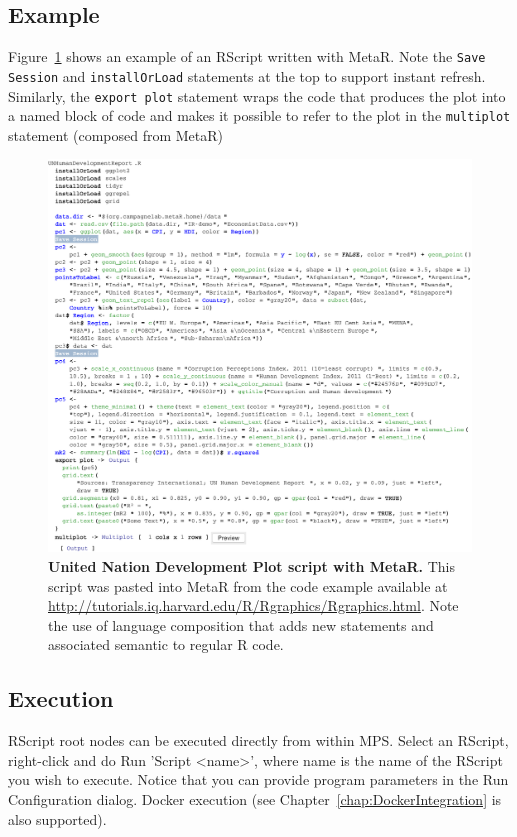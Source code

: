 \subsection{Example}
Figure~\ref{fig:UnitedNationPlotScript} shows an example of an RScript written with MetaR. Note the \texttt{Save Session} and \texttt{installOrLoad} statements at the top to support instant refresh. Similarly, the \texttt{export plot} statement wraps the code that produces the plot into a named block of code and makes it possible to refer to the plot in the \texttt{multiplot} statement (composed from MetaR)

\begin{figure}[h!tbp]
  \centering
  \includegraphics[width=\figWidthWide]{figures/UNPlot.pdf}
\caption[United Nation Development Plot script with MetaR.]{\textbf{United Nation Development Plot script with MetaR.} This script was pasted into MetaR from the code example available at \url{http://tutorials.iq.harvard.edu/R/Rgraphics/Rgraphics.html}. Note the use of language composition that adds new statements and associated semantic to regular R code.}
\label{fig:UnitedNationPlotScript}
\end{figure}

\subsection{Execution}
RScript root nodes can be executed directly from within MPS. Select an RScript, right-click and do Run 'Script <name>', where name is the name of the RScript you wish to execute. Notice that you can provide program parameters in the Run Configuration dialog. Docker execution (see Chapter~\ref{chap:DockerIntegration} is also supported).

